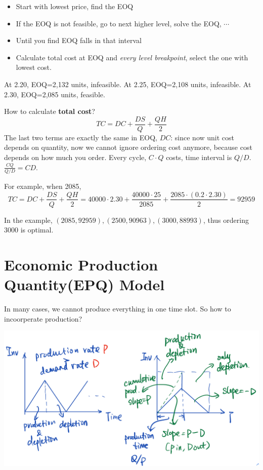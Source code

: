\documentclass[11pt, a4paper]{ISOM2700}
\begin{document}
\begin{spacing}{1.5}
    \begin{itemize}
        \item Start with lowest price, find the EOQ
        \item If the EOQ is not feasible, go to next higher level, solve the EOQ, $\cdots$
        \item Until you find EOQ falls in that interval
        \item Calculate total cost at EOQ and {\it every level breakpoint}, select the one with lowest cost.
    \end{itemize}

    At 2.20, EOQ=2,132 units, infeasible. At 2.25, EOQ=2,108 units, infeasible.
    At 2.30, EOQ=2,085 units, feasible.

    How to calculate {\bf total cost}?
    $$TC=DC+\frac{DS}{Q}+\dfrac{QH}{2}$$
    The last two terms are exactly the same in EOQ, $DC$: since now unit cost depends on quantity, 
    now we cannot ignore ordering cost anymore, because cost depends on how much you order. 
    Every cycle, $C\cdot Q$ costs, time interval is $Q/D$. $\frac{CQ}{Q/D}=CD$.

    For example, when 2085, $$TC=DC+\frac{DS}{Q}+\dfrac{QH}{2}=40000\cdot 2.30+\frac{40000\cdot 25}{2085}
    +\frac{2085\cdot (0.2\cdot 2.30)}{2}=92959$$

    In the example, $(2085, 92959), (2500, 90963), (3000, 88993)$, thus ordering 3000 is optimal.

    \section{Economic Production Quantity(EPQ) Model}

    In many cases, we cannot produce everything in one time slot. So how to incoorperate production?

    \begin{center}
        \includegraphics[scale=0.25]{images/S15-EPQ.jpeg}
    \end{center}


\end{spacing}
\end{document}
